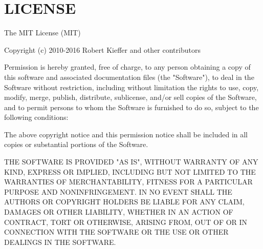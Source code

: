 \chapter{LICENSE}
\hypertarget{md__c_1_2_users_2_s_t_r_i_d_e_r_2source_2repos_2_internal_a_p_i_2_internal_a_p_i_2wwwroot_2lib_2741a65442ff47a8c2812b03312775c94}{}\label{md__c_1_2_users_2_s_t_r_i_d_e_r_2source_2repos_2_internal_a_p_i_2_internal_a_p_i_2wwwroot_2lib_2741a65442ff47a8c2812b03312775c94}
The MIT License (MIT)

Copyright (c) 2010-\/2016 Robert Kieffer and other contributors

Permission is hereby granted, free of charge, to any person obtaining a copy of this software and associated documentation files (the "{}\+Software"{}), to deal in the Software without restriction, including without limitation the rights to use, copy, modify, merge, publish, distribute, sublicense, and/or sell copies of the Software, and to permit persons to whom the Software is furnished to do so, subject to the following conditions\+:

The above copyright notice and this permission notice shall be included in all copies or substantial portions of the Software.

THE SOFTWARE IS PROVIDED "{}\+AS IS"{}, WITHOUT WARRANTY OF ANY KIND, EXPRESS OR IMPLIED, INCLUDING BUT NOT LIMITED TO THE WARRANTIES OF MERCHANTABILITY, FITNESS FOR A PARTICULAR PURPOSE AND NONINFRINGEMENT. IN NO EVENT SHALL THE AUTHORS OR COPYRIGHT HOLDERS BE LIABLE FOR ANY CLAIM, DAMAGES OR OTHER LIABILITY, WHETHER IN AN ACTION OF CONTRACT, TORT OR OTHERWISE, ARISING FROM, OUT OF OR IN CONNECTION WITH THE SOFTWARE OR THE USE OR OTHER DEALINGS IN THE SOFTWARE. 